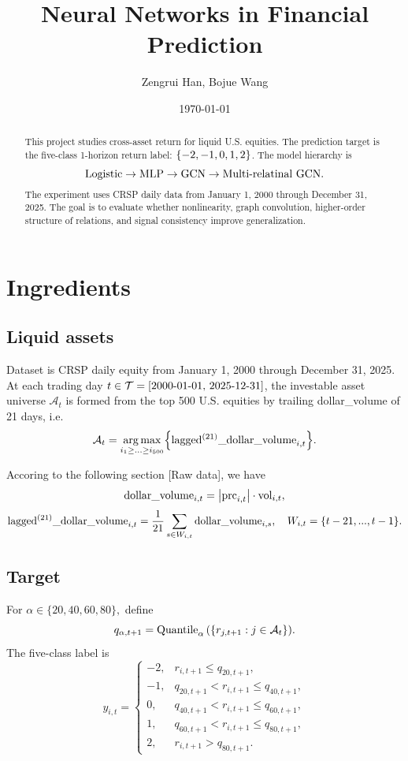 \documentclass[11pt]{article}
\title{\textbf{Neural Networks in Financial Prediction}}
\author{Zengrui Han, Bojue Wang}
\date{\today}
\begin{document}
\maketitle

\begin{abstract}
This project studies cross-asset return for liquid U.S. equities. The prediction target is the five-class 1-horizon return label: $\left\lbrace-2, -1, 0, 1, 2\right\rbrace$. The model hierarchy is
\[
    \text{Logistic} \to \text{MLP} \to \text{GCN} \to \text{Multi-relatinal GCN}.
\]
The experiment uses CRSP daily data from January 1, 2000 through December 31, 2025. The goal is to evaluate whether nonlinearity, graph convolution, higher-order structure of relations, and signal consistency improve generalization. 
\end{abstract}

\tableofcontents

\section{Ingredients}

\subsection{Liquid assets}

Dataset is CRSP daily equity from January 1, 2000 through December 31, 2025. At each trading day $t \in \mathcal T = [\text{2000-01-01, 2025-12-31}]$, the investable asset universe $\mathcal A_t$ is formed from the top 500 U.S. equities by trailing dollar\_volume of 21 days, i.e. \[\mathcal A_t = \argmax_{i_1\ge...\ge i_{500}}\st{\tx{lagged$^\pa{21}$\_dollar\_volume}_{i,t}}.\]

Accoring to the following section [Raw data], we have \[\text{dollar\_volume}_{i,t} = \left\lvert\text{prc}_{i,t}\right\rvert\cdot\text{vol}_{i,t},\] \[\tx{lagged$^\pa{21}$\_dollar\_volume}_{i,t} = \frac{1}{21} \sum_{s\in W_{i,t}}\tx{dollar\_volume}_{i,s},\quad W_{i,t} = \st{t-21,...,t-1}.\]
\subsection{Target}
For \(\alpha \in \{20,40,60,80\},\) define
\[
    q_{\alpha,t+1}
    =
    \operatorname{Quantile}_{\alpha}{\left\lparen\left\lbrace r_{j,t+1}: j \in \mathcal A_t\right\rbrace\right\rparen}.
\]
The five-class label is
\[
y_{i,t}
=
\begin{cases}
-2, & r_{i,t+1}\le q_{20,t+1},\\
-1, & q_{20,t+1}<r_{i,t+1}\le q_{40,t+1},\\
0, & q_{40,t+1}<r_{i,t+1}\le q_{60,t+1},\\
1, & q_{60,t+1}<r_{i,t+1}\le q_{80,t+1},\\
2, & r_{i,t+1}> q_{80,t+1}.
\end{cases}
\]
\end{document}
